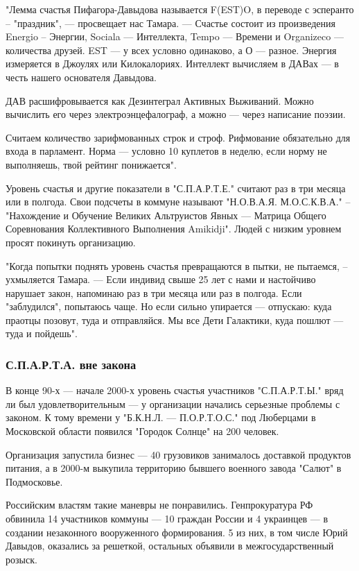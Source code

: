 "Лемма счастья Пифагора-Давыдова называется F(EST)O, в переводе с эсперанто  –
"праздник", --- просвещает нас Тамара. --- Счастье состоит из произведения Energio
– Энергии, Sociala --- Интеллекта, Tempo --- Времени и Organizeco --- количества
друзей. EST --- у всех условно одинаково, а О --- разное. Энергия измеряется в
Джоулях или Килокалориях. Интеллект вычисляем в ДАВах --- в честь нашего
основателя Давыдова. 

ДАВ расшифровывается как Дезинтеграл Активных Выживаний. Можно вычислить его
через электроэнцефалограф, а можно --- через написание поэзии. 

Считаем количество зарифмованных строк и строф. Рифмование обязательно для
входа в парламент. Норма --- условно 10 куплетов в неделю, если норму не
выполняешь, твой рейтинг понижается".

Уровень счастья и другие показатели в "С.П.А.Р.Т.Е." считают раз в три месяца
или в полгода. Свои подсчеты в коммуне называют "Н.О.В.А.Я. М.О.С.К.В.А." –
"Нахождение и Обучение Великих Альтруистов Явных --- Матрица Общего Соревнования
Коллективного Выполнения Amikidji". Людей с низким уровнем просят покинуть
организацию.

"Когда попытки поднять уровень счастья превращаются в пытки, не пытаемся, –
ухмыляется Тамара. --- Если индивид свыше 25 лет с нами и настойчиво нарушает
закон, напоминаю раз в три месяца или раз в полгода. Если "заблудился",
попытаюсь чаще. Но если сильно упирается --- отпускаю: куда праотцы позовут, туда
и отправляйся. Мы все Дети Галактики, куда пошлют --- туда и пойдешь".

\subsubsection{С.П.А.Р.Т.А. вне закона}

В конце 90-х --- начале 2000-х уровень счастья участников "С.П.А.Р.Т.Ы." вряд ли
был удовлетворительным --- у организации начались серьезные проблемы с законом. К
тому времени у "Б.К.Н.Л. --- П.О.Р.Т.О.С." под Люберцами в Московской области
появился "Городок Солнце" на 200 человек. 

Организация запустила бизнес --- 40 грузовиков занималось доставкой продуктов
питания, а в 2000-м выкупила территорию бывшего военного завода "Салют" в
Подмосковье.

Российским властям такие маневры не понравились. Генпрокуратура РФ обвинила 14
участников коммуны --- 10 граждан России и 4 украинцев --- в создании незаконного
вооруженного формирования. 5 из них, в том числе Юрий Давыдов, оказались за
решеткой, остальных объявили в межгосударственный розыск.

